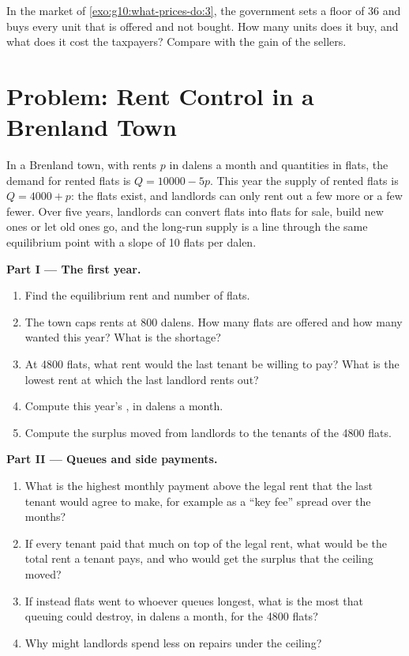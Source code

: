 \begin{exercise}[$\star\star\star$]\label{exo:g10:what-prices-do:15}
In the market of \cref{exo:g10:what-prices-do:3}, the government sets a floor of 36 and buys every unit that is offered and not bought. How many units does it buy, and
what does it cost the taxpayers? Compare with the gain of the sellers.
\end{exercise}

\section{Problem: Rent Control in a Brenland Town}

\begin{problem}
\label{pb:g10:what-prices-do:1}
In a Brenland town, with rents $p$ in dalens a month and quantities in flats, the demand for rented flats is $Q = 10000 - 5p$. This year the supply of rented flats is
$Q = 4000 + p$: the flats exist, and landlords can only rent out a few more or a few fewer. Over five years, landlords can convert flats into flats for sale, build new
ones or let old ones go, and the long-run supply is a line through the same equilibrium point with a slope of 10 flats per dalen.

\medskip
\noindent\textbf{Part I --- The first year.}
\begin{enumerate}
\item Find the equilibrium rent and number of flats.
\item The town caps rents at 800 dalens. How many flats are offered and how many wanted this year? What is the shortage?
\item At 4800 flats, what rent would the last tenant be willing to pay? What is the lowest rent at which the last landlord rents out?
\item Compute this year's , in dalens a month.
\item Compute the surplus moved from landlords to the tenants of the 4800 flats.
\end{enumerate}

\medskip
\noindent\textbf{Part II --- Queues and side payments.}
\begin{enumerate}[resume]
\item What is the highest monthly payment above the legal rent that the last tenant would agree to make, for example as a ``key fee'' spread over the months?
\item If every tenant paid that much on top of the legal rent, what would be the total rent a tenant pays, and who would get the surplus that the ceiling moved?
\item If instead flats went to whoever queues longest, what is the most that queuing could destroy, in dalens a month, for the 4800 flats?
\item Why might landlords spend less on repairs under the ceiling?
\end{enumerate}


\end{problem}
